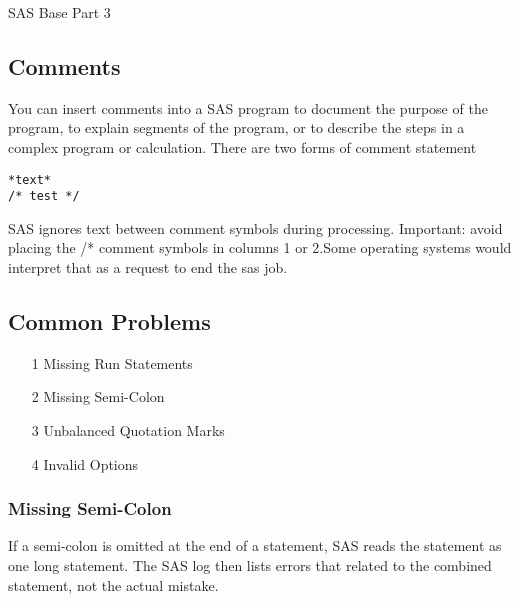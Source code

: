 SAS Base Part 3


\subsection*{Comments}
You can insert comments into a SAS program to document the purpose of the program, to 
explain segments of the program, or to describe the steps in a complex program or calculation.
There are two forms of comment statement
\begin{framed}
\begin{verbatim}
*text*
/* test */
\end{verbatim}
\end{framed}
SAS ignores text between comment symbols during processing.
Important: avoid placing the /* comment symbols in columns 1 or 2.Some operating systems would interpret that
as a request to end the sas job.

\subsection*{Common Problems}

\begin{itemize}
\item[1] Missing Run Statements
\item[2] Missing Semi-Colon
\item[3] Unbalanced Quotation Marks
\item[4] Invalid Options
\end{itemize}

\subsubsection*{Missing Semi-Colon}
If a semi-colon is omitted at the end of a statement, SAS reads the statement as one long statement.
The SAS log then lists errors that related to the combined statement, not the actual mistake.

